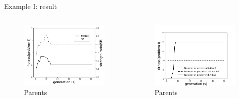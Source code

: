 \documentclass{beamer}
\begin{document}
\begin{frame}{Example I: result}
    \begin{columns}[c]
    \begin{column}{0.5\textwidth}
		\begin{figure}
			\includegraphics[scale=0.4]{fig/chapter4_first_result_strength_ratio_and_fitness.png}
			\caption{Parents}
		\end{figure}
    \end{column}
	\begin{column}{0.5\textwidth}
		\begin{figure}
			\includegraphics[scale=0.4]{fig/chapter4_first_result_number_of_three_groups.png}
			\caption{Parents}
		\end{figure}
	\end{column}
\end{columns}
\end{frame}
\end{document}
